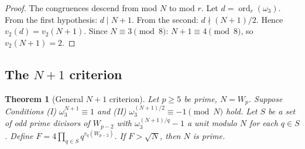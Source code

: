\documentclass[11pt,a4paper]{amsart}
\theoremstyle{plain}
\newtheorem{theorem}{Theorem}[section]
\theoremstyle{definition}
\DeclareMathOperator{\ord}{ord}
\newcommand{\wom}{\omega_3}
\begin{document}
\begin{proof}
The congruences descend from mod $N$ to mod $r$. Let $d = \ord_r(\wom)$.
From the first hypothesis: $d \mid N+1$. From the second: $d \nmid
(N+1)/2$. Hence $v_2(d) = v_2(N+1)$. Since $N \equiv 3 \pmod 8$: $N +
1 \equiv 4 \pmod 8$, so $v_2(N+1) = 2$.
\end{proof}

\subsection{The $N+1$ criterion}

\begin{theorem}[General $N+1$ criterion]
\label{thm:Nplus1}
Let $p \geq 5$ be prime, $N = W_p$. Suppose
Conditions (I) $\wom^{N+1} \equiv 1$ and (II) $\wom^{(N+1)/2} \equiv
-1 \pmod N$ hold. Let $S$ be a set of odd prime divisors of $W_{p-2}$
with $\wom^{(N+1)/q} - 1$ a unit modulo $N$ for each $q \in S$.
Define $F = 4 \prod_{q \in S} q^{v_q(W_{p-2})}$. If $F > \sqrt{N}$,
then $N$ is prime.
\end{theorem}
\end{document}
